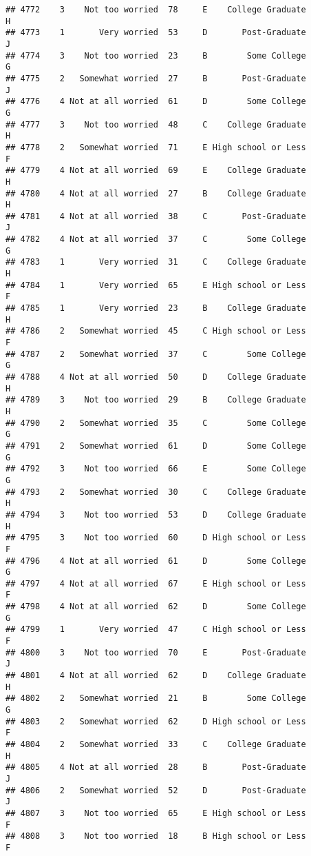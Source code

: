 \documentclass[
]{article}
\begin{document}
\begin{verbatim}
## 4772    3    Not too worried  78     E    College Graduate         H
## 4773    1       Very worried  53     D       Post-Graduate         J
## 4774    3    Not too worried  23     B        Some College         G
## 4775    2   Somewhat worried  27     B       Post-Graduate         J
## 4776    4 Not at all worried  61     D        Some College         G
## 4777    3    Not too worried  48     C    College Graduate         H
## 4778    2   Somewhat worried  71     E High school or Less         F
## 4779    4 Not at all worried  69     E    College Graduate         H
## 4780    4 Not at all worried  27     B    College Graduate         H
## 4781    4 Not at all worried  38     C       Post-Graduate         J
## 4782    4 Not at all worried  37     C        Some College         G
## 4783    1       Very worried  31     C    College Graduate         H
## 4784    1       Very worried  65     E High school or Less         F
## 4785    1       Very worried  23     B    College Graduate         H
## 4786    2   Somewhat worried  45     C High school or Less         F
## 4787    2   Somewhat worried  37     C        Some College         G
## 4788    4 Not at all worried  50     D    College Graduate         H
## 4789    3    Not too worried  29     B    College Graduate         H
## 4790    2   Somewhat worried  35     C        Some College         G
## 4791    2   Somewhat worried  61     D        Some College         G
## 4792    3    Not too worried  66     E        Some College         G
## 4793    2   Somewhat worried  30     C    College Graduate         H
## 4794    3    Not too worried  53     D    College Graduate         H
## 4795    3    Not too worried  60     D High school or Less         F
## 4796    4 Not at all worried  61     D        Some College         G
## 4797    4 Not at all worried  67     E High school or Less         F
## 4798    4 Not at all worried  62     D        Some College         G
## 4799    1       Very worried  47     C High school or Less         F
## 4800    3    Not too worried  70     E       Post-Graduate         J
## 4801    4 Not at all worried  62     D    College Graduate         H
## 4802    2   Somewhat worried  21     B        Some College         G
## 4803    2   Somewhat worried  62     D High school or Less         F
## 4804    2   Somewhat worried  33     C    College Graduate         H
## 4805    4 Not at all worried  28     B       Post-Graduate         J
## 4806    2   Somewhat worried  52     D       Post-Graduate         J
## 4807    3    Not too worried  65     E High school or Less         F
## 4808    3    Not too worried  18     B High school or Less         F

\end{verbatim}
\end{document}
